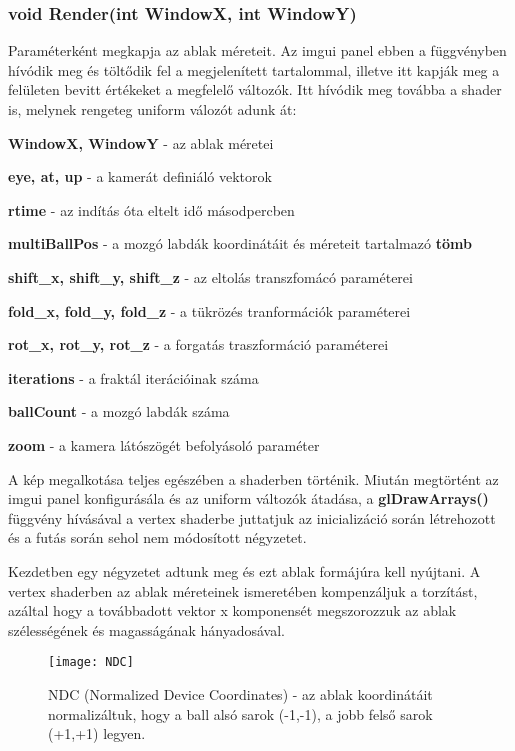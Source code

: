  
\subsubsection{void Render(int WindowX, int WindowY)} 

Paraméterként megkapja az ablak méreteit. Az imgui panel ebben a függvényben hívódik meg és töltődik fel a megjelenített tartalommal, illetve itt kapják meg a felületen bevitt értékeket a megfelelő változók. Itt hívódik meg továbba a shader is, melynek rengeteg uniform válozót adunk át:
\begin{compactitem}
	\item \textbf{WindowX, WindowY} - az ablak méretei
	\item \textbf{eye, at, up} - a kamerát definiáló vektorok
	\item \textbf{rtime} - az indítás óta eltelt idő másodpercben
	\item \textbf{multiBallPos} - a mozgó labdák koordinátáit és méreteit tartalmazó \textbf{tömb}
	\item \textbf{shift\_x, shift\_y, shift\_z} - az eltolás transzfomácó paraméterei
	\item \textbf{fold\_x, fold\_y, fold\_z} - a tükrözés tranformációk paraméterei
	\item \textbf{rot\_x, rot\_y, rot\_z} - a forgatás traszformáció paraméterei
	\item \textbf{iterations} - a fraktál iterációinak száma
	\item \textbf{ballCount} - a mozgó labdák száma
	\item \textbf{zoom} - a kamera látószögét befolyásoló paraméter
\end{compactitem}

A kép megalkotása teljes egészében a shaderben történik. Miután megtörtént az imgui panel konfigurásála és az uniform változók átadása, a \textbf{glDrawArrays()} függvény hívásával a vertex shaderbe juttatjuk az inicializáció során létrehozott és a futás során sehol nem módosított négyzetet.

Kezdetben egy négyzetet adtunk meg és ezt ablak formájúra kell nyújtani. A vertex shaderben az ablak méreteinek ismeretében kompenzáljuk a torzítást, azáltal hogy a továbbadott vektor x komponensét megszorozzuk az ablak szélességének és magasságának hányadosával. 

\begin{figure}[H]
	\centering
	\texttt{[image: NDC]}
	\caption{NDC (Normalized Device Coordinates) - az ablak koordinátáit normalizáltuk, hogy a ball alsó sarok (-1,-1), a jobb felső sarok (+1,+1) legyen. \cite{PythonOp51:online} }
	\label{fig:NDC}
\end{figure}

